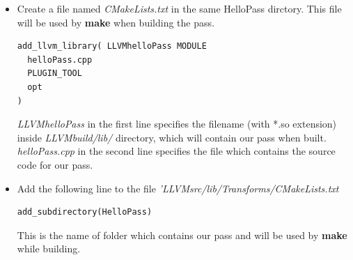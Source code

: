 \begin{itemize}
\begin{lstlisting}
    bool runOnFunction(Function &F) override {
      errs() << "Function Name: ";
      errs().write_escaped(F.getName()) << '\n';
      errs() << "===================================================\n";
      for(auto bb = F.begin(); bb != F.end(); bb++){
        errs() << "\tBasicBlock Name = " << bb->getName() << "\n";
        errs() << "\tBasicBlock Size = " << bb->size() << "\n";
        for(auto i = bb->begin(); i != bb->end(); i++){
          errs() << "\t" << "Instruction: " << *i << "\n";
          errs() << "\t" << "OpCode: " << i->getOpcode() << "\n";
          errs() << "\t" << "OpCodeName: " << i->getOpcodeName() << "\n";
          errs() << "\t" << "IsBinaryOp: " << i->isBinaryOp() << "\n";
          errs() << "\t" << "IsCommutative: " << i->isCommutative() << "\n";
          errs() << "\t" << "IsAssociative: " << i->isAssociative() << "\n";
        }
        errs() << "\n\n";
      } 
      return false;
    }
  };
}
char itrinstBB::ID = 0;
static RegisterPass<helloPass> X("hello", 
                                 "Iterates instructions in a function");
        \end{lstlisting}
        The above code contains a function pass - which means the 
        pass is run on every function defined in a file. Using 
        iterators it traverses each basic block of the function, and 
        for each basic block, it traverses each instruction and 
        prints the details of the instruction - like its opcode, 
        whether it is commutative and associative etc.\\
        \textbf{Important} - Notice the first argument \textbf{hello} 
        which is passed in the last line while registering the pass. 
        This argument will be passed as a flag to the 
        \textit{HelloPass} pass when we want to run the function-pass 
        defined inside \textit{helloPass} structure (the template 
        arguments in the last line).
    \item Create a file named \textit{CMakeLists.txt} in the same 
    HelloPass dirctory. This file will be used by \textbf{make} when 
    building the pass.
        \begin{lstlisting}
add_llvm_library( LLVMhelloPass MODULE
  helloPass.cpp
  PLUGIN_TOOL
  opt
)
        \end{lstlisting}
        \textit{LLVMhelloPass} in the first line specifies the 
        filename (with *.so extension) inside \textit{LLVMbuild/lib/}
        directory, which will contain our pass when built. 
        \textit{helloPass.cpp} in the second line specifies the file 
        which contains the source code for our pass.
    \item Add the following line to the file 
    \textit{'LLVMsrc/lib/Transforms/CMakeLists.txt}
        \begin{lstlisting}
add_subdirectory(HelloPass)
        \end{lstlisting}
        This is the name of folder which contains our pass and will be used by \textbf{make} while building.

\end{itemize}

